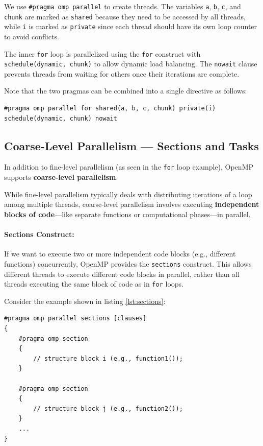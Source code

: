 \documentclass[12pt]{book}
\begin{document}
We use \texttt{\#pragma omp parallel} to create threads. The variables \texttt{a}, \texttt{b}, \texttt{c}, and \texttt{chunk} are marked as \texttt{shared} because they need to be accessed by all threads, while \texttt{i} is marked as \texttt{private} since each thread should have its own loop counter to avoid conflicts.

The inner \texttt{for} loop is parallelized using the \texttt{for} construct with \texttt{schedule(dynamic, chunk)} to allow dynamic load balancing. The \texttt{nowait} clause prevents threads from waiting for others once their iterations are complete.

Note that the two pragmas can be combined into a single directive as follows:

\begin{lstlisting}[style=cppstyle]
#pragma omp parallel for shared(a, b, c, chunk) private(i) schedule(dynamic, chunk) nowait
\end{lstlisting}


\subsection{Coarse-Level Parallelism — Sections and Tasks}

In addition to fine-level parallelism (as seen in the \texttt{for} loop example), OpenMP supports \textbf{coarse-level parallelism}. 

While fine-level parallelism typically deals with distributing iterations of a loop among multiple threads, coarse-level parallelism involves executing \textbf{independent blocks of code}—like separate functions or computational phases—in parallel.

\paragraph{Sections Construct:}
If we want to execute two or more independent code blocks (e.g., different functions) concurrently, OpenMP provides the \texttt{sections} construct. This allows different threads to execute different code blocks in parallel, rather than all threads executing the same block of code as in \texttt{for} loops.

Consider the example shown in listing \ref{lst:sections}:

\begin{lstlisting}[style=cppstyle, caption={Sections Construct}, captionpos=b, label={lst:sections}]
#pragma omp parallel sections [clauses]
{
    #pragma omp section
    {
        // structure block i (e.g., function1());
    }

    #pragma omp section
    {
        // structure block j (e.g., function2());
    }
    ...
}
\end{lstlisting}
\end{document}

